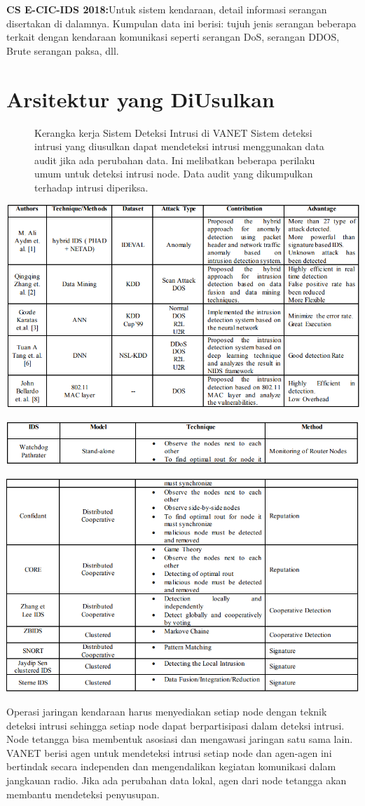 \documentclass[conference]{IEEEtran}
\begin{document}
\textbf{CS E-CIC-IDS 2018:}Untuk sistem kendaraan, detail
informasi serangan disertakan di dalamnya. Kumpulan data ini berisi:
tujuh jenis serangan beberapa terkait dengan kendaraan
komunikasi seperti serangan DoS, serangan DDOS, Brute
serangan paksa, dll.

\section{Arsitektur yang DiUsulkan}

\begin{figure}
    \centering
    \def\svgwidth{\columnwidth}
    \scalebox{0.9}{}
    \caption{Kerangka kerja Sistem Deteksi Intrusi di VANET
    Sistem deteksi intrusi yang diusulkan dapat mendeteksi
    intrusi menggunakan data audit jika ada perubahan data. Ini
    melibatkan beberapa perilaku umum untuk deteksi intrusi
    node. Data audit yang dikumpulkan terhadap intrusi diperiksa.}
\end{figure}


\begin{center}
        \centering
        \includegraphics[width=.4\textwidth]{gambar/a.PNG}
        \end{center}
        \begin{center}
        \centering
        \includegraphics[width=.4\textwidth]{gambar/b.PNG}
        \end{center}
        \begin{center}
        \centering
        \includegraphics[width=.4\textwidth]{gambar/c.PNG}
\end{center}
        
Operasi jaringan kendaraan harus menyediakan setiap node dengan
teknik deteksi intrusi sehingga setiap node dapat
berpartisipasi dalam deteksi intrusi. Node tetangga bisa
membentuk asosiasi dan mengawasi jaringan satu sama lain.
VANET berisi agen untuk mendeteksi intrusi setiap node
dan agen-agen ini bertindak secara independen dan mengendalikan
kegiatan komunikasi dalam jangkauan radio. Jika ada
perubahan data lokal, agen dari node tetangga akan
membantu mendeteksi penyusupan.
\end{document}

